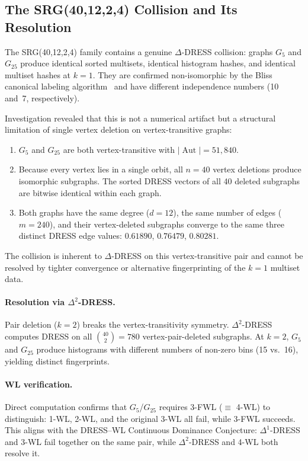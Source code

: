 \documentclass[11pt,a4paper]{article}
\begin{document}
\subsection{The SRG(40,12,2,4) Collision and Its Resolution}
\label{sec:collision}

The SRG(40,12,2,4) family contains a genuine $\Delta$-DRESS collision: graphs $G_5$ and $G_{25}$ produce identical sorted multisets, identical histogram hashes, and identical multiset hashes at $k = 1$.
They are confirmed non-isomorphic by the Bliss canonical labeling algorithm~\cite{junttila2007bliss} and have different independence numbers (10 and~7, respectively).

Investigation revealed that this is not a numerical artifact but a structural limitation of single vertex deletion on vertex-transitive graphs:

\begin{enumerate}
    \item $G_5$ and $G_{25}$ are both vertex-transitive with $|\operatorname{Aut}| = 51{,}840$.

    \item Because every vertex lies in a single orbit, all $n = 40$ vertex deletions produce isomorphic subgraphs.
    The sorted DRESS vectors of all 40 deleted subgraphs are bitwise identical within each graph.

    \item Both graphs have the same degree ($d = 12$), the same number of edges ($m = 240$), and their vertex-deleted subgraphs converge to the same three distinct DRESS edge values: $0.61890$, $0.76479$, $0.80281$.

\end{enumerate}

The collision is inherent to $\Delta$-DRESS on this vertex-transitive pair and cannot be resolved by tighter convergence or alternative fingerprinting of the $k = 1$ multiset data.

\paragraph{Resolution via $\Delta^2$-DRESS.}
Pair deletion ($k = 2$) breaks the vertex-transitivity symmetry.
$\Delta^2$-DRESS computes DRESS on all $\binom{40}{2} = 780$ vertex-pair-deleted subgraphs.
At $k = 2$, $G_5$ and $G_{25}$ produce histograms with different numbers of non-zero bins (15 vs.\ 16), yielding distinct fingerprints.

\paragraph{WL verification.}
Direct computation confirms that $G_5$/$G_{25}$ requires 3-FWL ($\equiv$ 4-WL) to distinguish: 1-WL, 2-WL, and the original 3-WL all fail, while 3-FWL succeeds.
This aligns with the DRESS--WL Continuous Dominance Conjecture: $\Delta^1$-DRESS and 3-WL fail together on the same pair, while $\Delta^2$-DRESS and 4-WL both resolve it.
\end{document}
